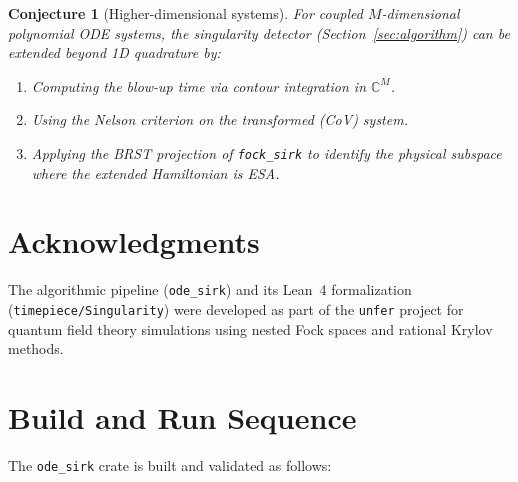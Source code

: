 \documentclass[11pt,a4paper]{article}
\newtheorem{conjecture}{Conjecture}
\newcommand{\Cset}{\mathbb{C}}
\begin{document}
\begin{conjecture}[Higher-dimensional systems]
For coupled $M$-dimensional polynomial ODE systems, the singularity
detector (Section~\ref{sec:algorithm}) can be extended beyond 1D
quadrature by:
\begin{enumerate}
  \item Computing the blow-up time via contour integration in $\Cset^{M}$.
  \item Using the Nelson criterion on the transformed (CoV) system.
  \item Applying the BRST projection of \texttt{fock\_sirk} to identify
    the physical subspace where the extended Hamiltonian is ESA.
\end{enumerate}
\end{conjecture}

\section*{Acknowledgments}

The algorithmic pipeline (\texttt{ode\_sirk}) and its Lean~4
formalization (\texttt{timepiece/Singularity}) were developed as part of
the \texttt{unfer} project for quantum field theory simulations using
nested Fock spaces and rational Krylov methods.

\appendix
\section{Build and Run Sequence}\label{app:build}

The \texttt{ode\_sirk} crate is built and validated as follows:
\end{document}
